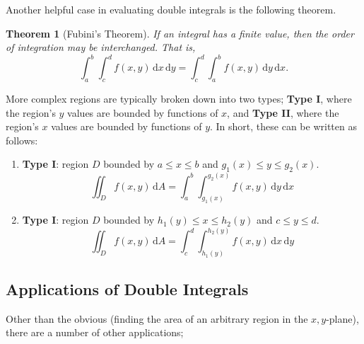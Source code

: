 \documentclass[12pt]{article}
\newtheorem*{theorem}{Theorem}
\begin{document}
{Another helpful case in evaluating double integrals is the following theorem.

\begin{theorem}[Fubini's Theorem]
    If an integral has a finite value, then the order of integration may be interchanged. That is, \[\int_a^b \int_c^d f(x,y) \,\text{d}x\,\text{d}y = \int_c^d \int_a^b f(x,y) \,\text{d}y \,\text{d}x.\]
\end{theorem}

More complex regions are typically broken down into two types; \textbf{Type I}, where the region's $y$ values are bounded by functions of $x$, and \textbf{Type II}, where the region's $x$ values are bounded by functions of $y$. In short, these can be written as follows:
\begin{enumerate}
    \item \textbf{Type I}: region $D$ bounded by $a \leq x \leq b$ and $g_1(x) \leq y \leq g_2(x)$. \[\iint_D f(x,y) \,\text{d}A = \int_a^b \int_{g_1(x)}^{g_2(x)} f(x,y) \,\text{d}y \,\text{d}x\]
    \item \textbf{Type I}: region $D$ bounded by $h_1(y) \leq x \leq h_2(y)$ and $c \leq y \leq d$. \[\iint_D f(x,y) \,\text{d}A = \int_c^d \int_{h_1(y)}^{h_2(y)} f(x,y) \, \text{d}x \, \text{d}y\]
\end{enumerate}

\subsection{Applications of Double Integrals}

Other than the obvious (finding the area of an arbitrary region in the $x,y$-plane), there are a number of other applications;

}
\end{document}
